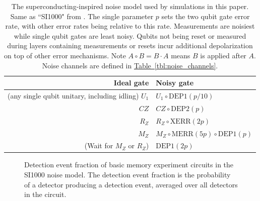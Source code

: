 \documentclass[onecolumn,unpublished,a4paper]{quantumarticle}
\theoremstyle{definition}
\theoremstyle{definition}
\theoremstyle{definition}
\newcommand{\tbl}[1]{\hyperref[tbl:#1]{Table~\ref*{tbl:#1}}}
\begin{document}
\begin{table}
    \centering
    \begin{tabular}{|r|l|}
    \hline
    Ideal gate & Noisy gate
    \\
    \hline
    (any single qubit unitary, including idling) $U_1$ & $U_1 \circ \text{DEP1}(p / 10)$
    \\
    $CZ$ & $CZ \circ \text{DEP2}(p)$
    \\
    \hline
    $R_Z$ & $R_Z \circ \text{XERR}(2p)$
    \\
    $M_Z$ & $M_Z \circ \text{MERR}(5p) \circ \text{DEP1}(p)$
    \\
    \hline
    (Wait for $M_Z$ or $R_Z$) & $\text{DEP1}(2p)$
    \\
    \hline
    \end{tabular}
    \caption{
        The superconducting-inspired noise model used by simulations in this paper.
        Same as ``SI1000" from \cite{gidney2021honeycombmemory}.
        The single parameter $p$ sets the two qubit gate error rate, with other error rates being relative to this rate.
        Measurements are noisiest while single qubit gates are least noisy.
        Qubits not being reset or measured during layers containing measurements or resets incur additional depolarization on top of other error mechanisms.
        Note $A \circ B = B \cdot A$ means $B$ is applied after $A$.
        Noise channels are defined in \tbl{noise_channels}.
    }
    \label{tbl:noise_model}
\end{table}

\begin{figure}
    \centering
    \caption{
        Detection event fraction of basic memory experiment circuits in the SI1000 noise model.
        The detection event fraction is the probability of a detector producing a detection event, averaged over all detectors in the circuit.
    }
    \label{fig:det_frac}
\end{figure}
\end{document}
